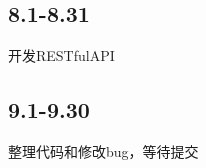 \documentclass{article}
\begin{document}
\hypertarget{section-6}{%
\subsection{8.1-8.31}\label{section-6}}

开发RESTfulAPI

\hypertarget{section-7}{%
\subsection{9.1-9.30}\label{section-7}}
整理代码和修改bug，等待提交
\end{document}
